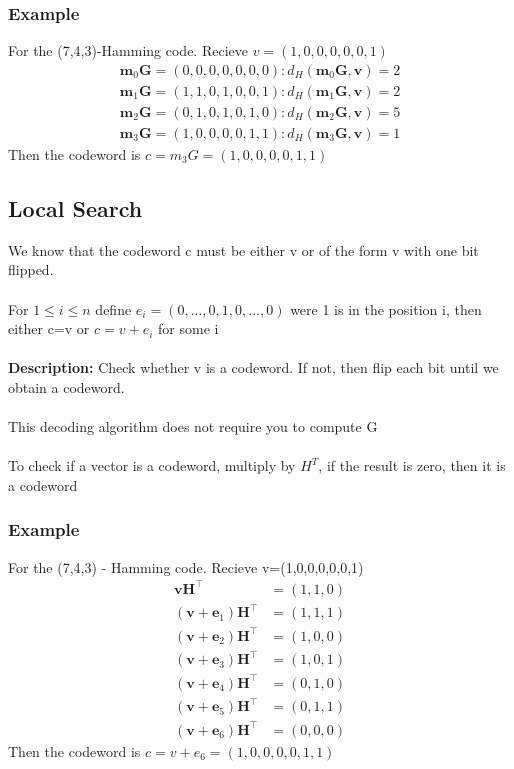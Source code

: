 \documentclass{article}[18pt]
\begin{document}
\subsubsection{Example}
For the (7,4,3)-Hamming code. Recieve $v=(1,0,0,0,0,0,1)$
$$\begin{array} { l } { \mathbf { m } _ { 0 } \mathbf { G } = ( 0,0,0,0,0,0,0 ) : d _ { H } \left( \mathbf { m } _ { 0 } \mathbf { G } , \mathbf { v } \right) = 2 } \\ { \mathbf { m } _ { 1 } \mathbf { G } = ( 1,1,0,1,0,0,1 ) : d _ { H } \left( \mathbf { m } _ { 1 } \mathbf { G } , \mathbf { v } \right) = 2 } \\ { \mathbf { m } _ { 2 } \mathbf { G } = ( 0,1,0,1,0,1,0 ) : d _ { H } \left( \mathbf { m } _ { 2 } \mathbf { G } , \mathbf { v } \right) = 5 } \\ { \mathbf { m } _ { 3 } \mathbf { G } = ( 1,0,0,0,0,1,1 ) : d _ { H } \left( \mathbf { m } _ { 3 } \mathbf { G } , \mathbf { v } \right) = 1 } \end{array}$$
Then the codeword is $c=m_3G=(1,0,0,0,0,1,1)$
\subsection{Local Search}
We know that the codeword c must be either v or of the form v with one bit flipped.\\
\\
For $1\leqslant i\leqslant n$ define $e_i=(0,...,0,1,0,...,0)$ were 1 is in the position i, then either c=v or $c=v+e_i$ for some i\\
\\
\textbf{Description:} Check whether v is a codeword. If not, then flip each bit until we obtain a codeword.\\
\\
This decoding algorithm does not require you to compute G\\
\\
To check if a vector is a codeword, multiply by $H^T$, if the result is zero, then it is a codeword
\subsubsection{Example}
For the (7,4,3) - Hamming code. Recieve v=(1,0,0,0,0,0,1)
$$\begin{aligned} \mathbf { v H } ^ { \top } & = ( 1,1,0 ) \\ \left( \mathbf { v } + \mathbf { e } _ { 1 } \right) \mathbf { H } ^ { \top } & = ( 1,1,1 ) \\ \left( \mathbf { v } + \mathbf { e } _ { 2 } \right) \mathbf { H } ^ { \top } & = ( 1,0,0 ) \\ \left( \mathbf { v } + \mathbf { e } _ { 3 } \right) \mathbf { H } ^ { \top } & = ( 1,0,1 ) \\ \left( \mathbf { v } + \mathbf { e } _ { 4 } \right) \mathbf { H } ^ { \top } & = ( 0,1,0 ) \\ \left( \mathbf { v } + \mathbf { e } _ { 5 } \right) \mathbf { H } ^ { \top } & = ( 0,1,1 ) \\ \left( \mathbf { v } + \mathbf { e } _ { 6 } \right) \mathbf { H } ^ { \top } & = ( 0,0,0 ) \end{aligned}$$
Then the codeword is $c=v+e_6=(1,0,0,0,0,1,1)$
\end{document}
